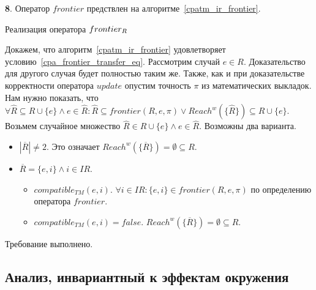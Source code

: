 {\textbf 8.} %
Оператор $frontier$ предствлен на алгоритме~\ref{cpatm_ir_frontier}.
\begin{algorithm}
 \caption{Реализация оператора $frontier_R$}
 \label{cpatm_ir_frontier}
\end{algorithm}

Докажем, что алгоритм~\ref{cpatm_ir_frontier} удовлетворяет условию~\ref{cpa_frontier_transfer_eq}.
Рассмотрим случай $e \in R$. Доказательство для другого случая будет полностью таким же.
Также, как и при доказательстве корректности оператора $update$ опустим точность $\pi$ из математических выкладок.
Нам нужно показать, что
$\forall \widehat{R} \subseteq R \cup \{e\} \land e \in \widehat{R}: \widehat{R} \subseteq frontier(R, e, \pi) \lor Reach^w(\{\widehat{R}\}) \subseteq R \cup \{e\}$. 
Возьмем случайное множество $\widehat{R} \in R \cup \{e\} \land e \in \widehat{R}$. Возможны два варианта.

\begin{itemize}
\item $|\overline{R}| \neq 2$. Это означает $Reach^w(\{\overline{R}\}) = \emptyset \subseteq R$.
\item $\overline{R} = \{e, i\} \land i \in IR$.
\begin{itemize}
\item $compatible_{TM}(e, i)$. $\forall i \in IR: \{e, i\} \in frontier(R, e, \pi)$ по определению оператора $frontier$.
\item $compatible_{TM}(e, i) = false$. $Reach^w(\{\overline{R}\}) = \emptyset \subseteq R$.
\end{itemize}
\end{itemize}

Требование выполнено.

\subsection{Анализ, инвариантный к эффектам окружения}

